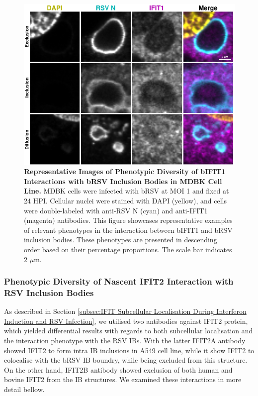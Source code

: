 \begin{figure}
    \centering
    \includegraphics[width=1\linewidth]{08. Chapter 3/Figs/02. Infection/01. IFIT1/09. mdbk i1.pdf}
    \caption[Representative Images of Phenotypic Diversity of bIFIT1 Interactions with bRSV Inclusion Bodies in MDBK Cell Line.]{\textbf{Representative Images of Phenotypic Diversity of bIFIT1 Interactions with bRSV Inclusion Bodies in MDBK Cell Line.} MDBK cells were infected with bRSV at MOI 1 and fixed at 24 HPI. Cellular nuclei were stained with DAPI (yellow), and cells were double-labeled with anti-RSV N (cyan) and anti-IFIT1 (magenta) antibodies. This figure showcases representative examples of relevant phenotypes in the interaction between bIFIT1 and bRSV inclusion bodies. These phenotypes are presented in descending order based on their percentage proportions. The scale bar indicates 2 \(\mu \mbox{m}\).}
    \label{fig:Representative Images of Phenotypic Diversity of bIFIT1 Interactions with bRSV Inclusion Bodies in MDBK Cell Line}
\end{figure}

\subsubsection{Phenotypic Diversity of Nascent IFIT2 Interaction with RSV Inclusion Bodies}
As described in Section \ref{subsec:IFIT Subcellular Localisation During Interferon Induction and RSV Infection}, we utilised two antibodies against IFIT2 protein, which yielded differential results with regards to both subcellular localisation and the interaction phenotype with the RSV IBs. With the latter IFIT2A antibody showed IFIT2 to form intra IB inclusions in A549 cell line, while it show IFIT2 to colocalise with the bRSV IB boundry, while being excluded from this structure. On the other hand, IFIT2B antibody showed exclusion of both human and bovine IFIT2 from the IB structures. We examined these interactions in more detail bellow.

